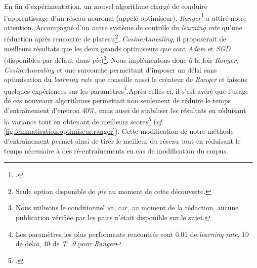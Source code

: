 En fin d'expérimentation, un nouvel algorithme chargé de conduire l'apprentissage d'un réseau neuronal (appelé optimiseur), \textit{Ranger}\footcite{wright_new_2019} a attiré notre attention. Accompagné d'un autre système de contrôle du \textit{learning rate} qu'une réduction après rencontre de plateau\footnote{Seule option disponible de \textit{pie} au moment de cette découverte.}, \textit{CosineAnnealing}, il proposerait de meilleurs résultats que les deux grands optimiseurs que sont \textit{Adam} et \textit{SGD} (disponibles par défaut dans \textit{pie})\footnote{Nous utilisons le conditionnel ici, car, au moment de la rédaction, aucune publication vérifiée par les pairs n'était disponible sur le sujet.}. Nous implémentons donc à la fois \textit{Ranger}, \textit{CosineAnnealing} et une surcouche permettant d'imposer un délai sans optimisation du \textit{learning rate} que conseille aussi le créateur de \textit{Ranger} et faisons quelques expériences sur les paramètres\footnote{Les paramètres les plus performants rencontrés sont 0.01 de \textit{learning rate}, 10 de délai, 40 de \textit{T\_0} pour \textit{Ranger}}.Après celles-ci, il s'est avéré que l'usage de ces nouveaux algorithmes permettait non seulement de réduire le temps d'entraînement d'environ 40\%, mais aussi de stabiliser les résultats en réduisant la variance tout en obtenant de meilleurs scores\footcite{clerice_allow_nodate} (\textit{cf.} \ref{fig:lemmatisation:optimiseur:ranger}). Cette modification de notre méthode d'entraînement permet ainsi de tirer le meilleur du réseau tout en réduisant le temps nécessaire à des ré-entraînements en cas de modification du corpus.


